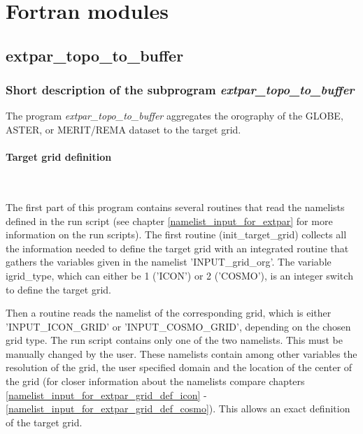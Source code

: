 \documentclass[a4paper,10pt,DIV14,BCOR1cm,titlepage,twoside]{scrartcl}
\begin{document}
\clearpage

\section{Fortran modules}\label{Fortran programmes}
\subsection{extpar\_topo\_to\_buffer}\label{extpar_topo_to_buffer}
\subsubsection{Short description of the subprogram \textit{extpar\_topo\_to\_buffer}}
The program \textit{extpar\_topo\_to\_buffer} aggregates the orography of the GLOBE, ASTER, or MERIT/REMA  dataset to the target grid.
\paragraph{Target grid definition}\ \par\medskip\noindent
The first part of this program contains several routines that read the namelists defined in the run script (see chapter \ref{namelist_input_for_extpar} for more information on the run scripts). The first routine (init\_target\_grid) collects all the information needed to define the target grid with an integrated routine that gathers the variables given in the namelist 'INPUT\_grid\_org'. The variable igrid\_type, which can either be 1 ('ICON') or 2 ('COSMO'), is an integer switch to define the target grid. \par\medskip\noindent
Then a routine reads the namelist of the corresponding grid, which is either 'INPUT\_ICON\_GRID' or 'INPUT\_COSMO\_GRID', depending on the chosen grid type. The run script contains only one of the two namelists. This must be manually changed by the user. These namelists contain among other variables the resolution of the grid, the user specified domain and the location of the center of the grid (for closer information about the namelists compare chapters \ref{namelist_input_for_extpar_grid_def_icon} - \ref{namelist_input_for_extpar_grid_def_cosmo}). This allows an exact definition of the target grid. \par\medskip\noindent
\end{document}
